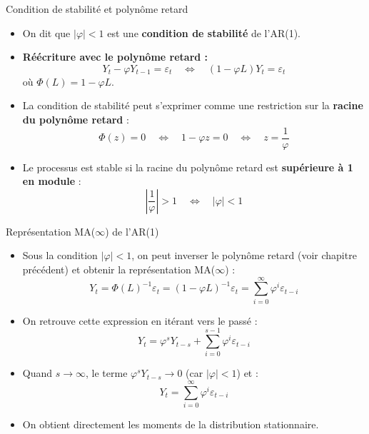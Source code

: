 \documentclass[11pt,aspectratio=169]{beamer}
\begin{document}
\begin{frame}{Condition de stabilité et polynôme retard}

\begin{itemize}

\item On dit que $|\varphi| < 1$ est une \textbf{condition de stabilité} de l'AR(1).\newline

\item \textbf{Réécriture avec le polynôme retard :}
\[
Y_t - \varphi Y_{t-1} = \varepsilon_t \quad \Leftrightarrow \quad (1 - \varphi L) Y_t = \varepsilon_t
\]
où $\Phi(L) = 1 - \varphi L$.\newline

\item La condition de stabilité peut s'exprimer comme une restriction sur la \textbf{racine du polynôme retard} :
\[
\Phi(z) = 0 \quad \Leftrightarrow \quad 1 - \varphi z = 0 \quad \Leftrightarrow \quad z = \frac{1}{\varphi}
\]

\item Le processus est stable si la racine du polynôme retard est \textbf{supérieure à 1 en module} :
\[
\left|\frac{1}{\varphi}\right| > 1 \quad \Leftrightarrow \quad |\varphi| < 1
\]

\end{itemize}
\end{frame}

\begin{frame}{Représentation MA($\infty$) de l'AR(1)}

\begin{itemize}

\item Sous la condition $|\varphi| < 1$, on peut inverser le polynôme retard (voir chapitre précédent) et obtenir la représentation MA($\infty$) :
\[
Y_t = \Phi(L)^{-1} \varepsilon_t = (1 - \varphi L)^{-1} \varepsilon_t = \sum_{i=0}^{\infty} \varphi^i \varepsilon_{t-i}
\]

\item On retrouve cette expression en itérant vers le passé :
\[
Y_t = \varphi^s Y_{t-s} + \sum_{i=0}^{s-1} \varphi^i \varepsilon_{t-i}
\]

\item Quand $s \to \infty$, le terme $\varphi^s Y_{t-s} \to 0$ (car $|\varphi| < 1$) et :
\[
Y_t = \sum_{i=0}^{\infty} \varphi^i \varepsilon_{t-i}
\]

\item On obtient directement les moments de la distribution stationnaire.

\end{itemize}
\end{frame}
\end{document}
